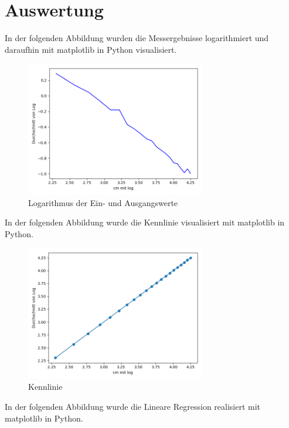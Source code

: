\documentclass[12pt, oneside, a4paper, \docLanguage]{report}
\begin{document}
\section{Auswertung}
\label{chap:VERSUCH_2_AUSWERTUNG}
In der folgenden Abbildung wurden die Messergebnisse logarithmiert und daraufhin mit matplotlib in Python visualisiert.

\begin{figure}[hbt!]
	\centering\small
	\includegraphics[width=0.7\textwidth]{media/myplot4.png}
	\caption{Logarithmus der Ein- und Ausgangswerte}
	\label{fig:Logarithmus der Ein- und Ausgangswerter}
\end{figure}
In der folgenden Abbildung wurde die Kennlinie visualisiert mit matplotlib in Python.

\begin{figure}[hbt!]
	\centering\small
	\includegraphics[width=0.7\textwidth]{media/myplot5.png}
	\caption{Kennlinie}
	\label{fig:Kennlinie}
\end{figure}
In der folgenden Abbildung wurde die Lineare Regression realisiert mit matplotlib in Python.
\end{document}
